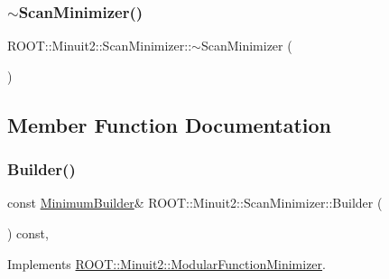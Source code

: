 \mbox{\label{classROOT_1_1Minuit2_1_1ScanMinimizer_a4c905e6b138573bf48d92cbcace158a7}} 
\subsubsection{\texorpdfstring{$\sim$ScanMinimizer()}{~ScanMinimizer()}\hspace{0.1cm}{\footnotesize\ttfamily [2/2]}}
{\footnotesize\ttfamily R\+O\+O\+T\+::\+Minuit2\+::\+Scan\+Minimizer\+::$\sim$\+Scan\+Minimizer (\begin{DoxyParamCaption}{ }\end{DoxyParamCaption})\hspace{0.3cm}{\ttfamily [inline]}}



\subsection{Member Function Documentation}
\mbox{\label{classROOT_1_1Minuit2_1_1ScanMinimizer_a6ca4b63ec20ed8dd310e02d427ef05fa}} 
\subsubsection{\texorpdfstring{Builder()}{Builder()}\hspace{0.1cm}{\footnotesize\ttfamily [1/2]}}
{\footnotesize\ttfamily const \mbox{\hyperlink{classROOT_1_1Minuit2_1_1MinimumBuilder}{Minimum\+Builder}}\& R\+O\+O\+T\+::\+Minuit2\+::\+Scan\+Minimizer\+::\+Builder (\begin{DoxyParamCaption}{ }\end{DoxyParamCaption}) const\hspace{0.3cm}{\ttfamily [inline]}, {\ttfamily [virtual]}}



Implements \mbox{\hyperlink{classROOT_1_1Minuit2_1_1ModularFunctionMinimizer_a13e98551cf14e927c61e1e34ecf8ba8b}{R\+O\+O\+T\+::\+Minuit2\+::\+Modular\+Function\+Minimizer}}.

